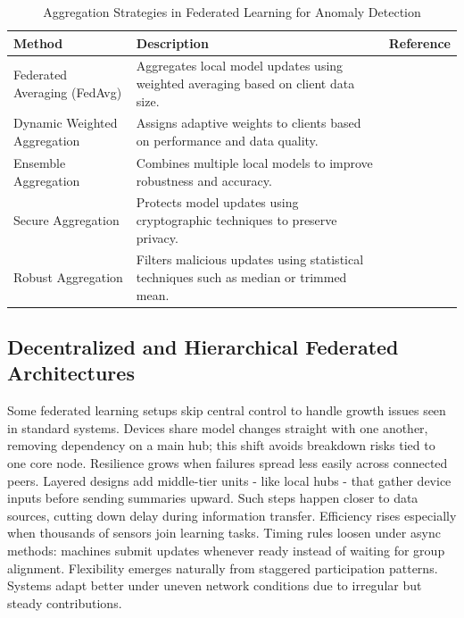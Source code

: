 \documentclass[12pt]{article}
\begin{document}
\renewcommand{\arraystretch}{1.2}
\begin{table}[htbp]
\small
\centering
\caption{Aggregation Strategies in Federated Learning for Anomaly Detection}
\label{tab:aggregation}
\begin{tabular}{|p{3cm}|p{4cm}|p{3cm}|}
\hline
\textbf{Method} & \textbf{Description} & \textbf{Reference} \\
\hline
Federated Averaging (FedAvg) & Aggregates local model updates using weighted averaging based on client data size. & \cite{paper4} \\
\hline
Dynamic Weighted Aggregation & Assigns adaptive weights to clients based on performance and data quality. & \cite{paper6} \\
\hline
Ensemble Aggregation & Combines multiple local models to improve robustness and accuracy. & \cite{paper3} \\
\hline
Secure Aggregation & Protects model updates using cryptographic techniques to preserve privacy. & \cite{paper11} \\
\hline
Robust Aggregation & Filters malicious updates using statistical techniques such as median or trimmed mean. & \cite{paper9} \\
\hline
\end{tabular}
\end{table}

\subsection{Decentralized and Hierarchical Federated Architectures}

Some federated learning setups skip central control to handle growth issues seen in standard systems. Devices share model changes straight with one another, removing dependency on a main hub; this shift avoids breakdown risks tied to one core node. Resilience grows when failures spread less easily across connected peers. Layered designs add middle-tier units - like local hubs - that gather device inputs before sending summaries upward. Such steps happen closer to data sources, cutting down delay during information transfer. Efficiency rises especially when thousands of sensors join learning tasks. Timing rules loosen under async methods: machines submit updates whenever ready instead of waiting for group alignment. Flexibility emerges naturally from staggered participation patterns. Systems adapt better under uneven network conditions due to irregular but steady contributions.
\end{document}
